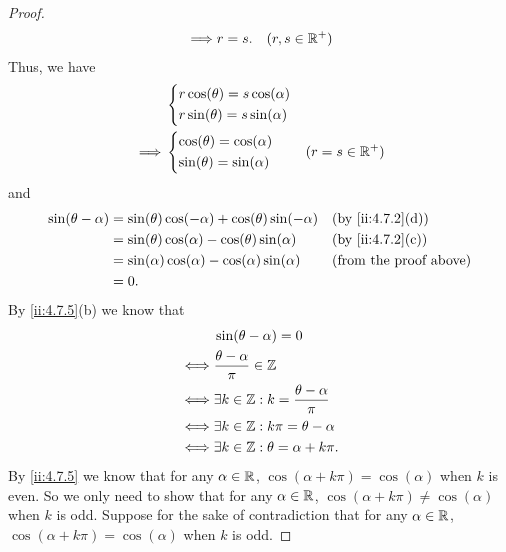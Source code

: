 \begin{proof}
\begin{align*}
    \implies & r = s.                                                                                                                                & (r, s \in \mathbb{R}^+)
  \end{align*}
  Thus, we have
  \begin{align*}
             & \begin{dcases}
                 r \cos(\theta) = s \cos(\alpha) \\
                 r \sin(\theta) = s \sin(\alpha)
               \end{dcases}     \\
    \implies & \begin{dcases}
                 \cos(\theta) = \cos(\alpha) \\
                 \sin(\theta) = \sin(\alpha)
               \end{dcases}     & (r = s \in \mathbb{R}^+)
  \end{align*}
  and
  \begin{align*}
    \sin(\theta - \alpha) & = \sin(\theta) \cos(-\alpha) + \cos(\theta) \sin(-\alpha) &  & \by{ii:4.7.2}[d]              \\
                          & = \sin(\theta) \cos(\alpha) - \cos(\theta) \sin(\alpha)   &  & \by{ii:4.7.2}[c]              \\
                          & = \sin(\alpha) \cos(\alpha) - \cos(\alpha) \sin(\alpha)   &  & \text{(from the proof above)} \\
                          & = 0.
  \end{align*}
  By \cref{ii:4.7.5}(b) we know that
  \begin{align*}
         & \sin(\theta - \alpha) = 0                           \\
    \iff & \dfrac{\theta - \alpha}{\pi} \in \mathbb{Z}                 \\
    \iff & \exists k \in \mathbb{Z} : k = \dfrac{\theta - \alpha}{\pi} \\
    \iff & \exists k \in \mathbb{Z} : k \pi = \theta - \alpha          \\
    \iff & \exists k \in \mathbb{Z} : \theta = \alpha + k \pi.
  \end{align*}
  By \cref{ii:4.7.5} we know that for any \(\alpha \in \mathbb{R}\), \(\cos(\alpha + k \pi) = \cos(\alpha)\) when \(k\) is even.
  So we only need to show that for any \(\alpha \in \mathbb{R}\), \(\cos(\alpha + k \pi) \neq \cos(\alpha)\) when \(k\) is odd.
  Suppose for the sake of contradiction that for any \(\alpha \in \mathbb{R}\), \(\cos(\alpha + k \pi) = \cos(\alpha)\) when \(k\) is odd.

\end{proof}
